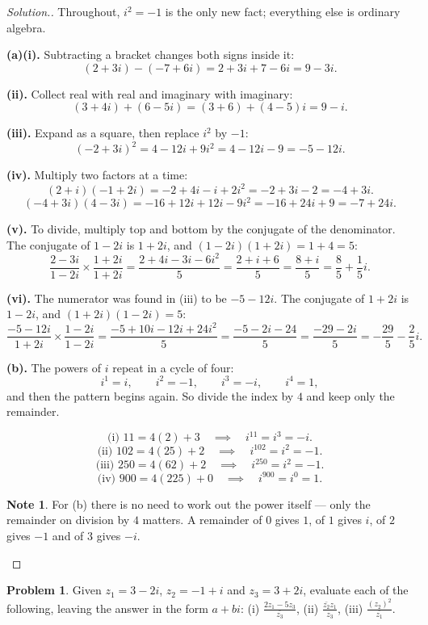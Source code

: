 \documentclass[11pt,a4paper]{article}
\theoremstyle{definition}
\newtheorem{note}[thm]{Note}
\newtheorem{problemx}{Problem}[section]
\newenvironment{problem}{\begin{problemx}}{\end{problemx}}
\newenvironment{solution}
  {\renewcommand{\qedsymbol}{}\begin{proof}[\textit{Solution}.]}
  {\end{proof}}
\begin{document}
\begin{solution}
Throughout, $i^2=-1$ is the only new fact; everything else is ordinary algebra.

\textbf{(a)(i).} Subtracting a bracket changes both signs inside it:
$$(2+3i)-(-7+6i)=2+3i+7-6i=9-3i.$$

\textbf{(ii).} Collect real with real and imaginary with imaginary:
$$(3+4i)+(6-5i)=(3+6)+(4-5)i=9-i.$$

\textbf{(iii).} Expand as a square, then replace $i^2$ by $-1$:
$$(-2+3i)^2=4-12i+9i^2=4-12i-9=-5-12i.$$

\textbf{(iv).} Multiply two factors at a time:
$$(2+i)(-1+2i)=-2+4i-i+2i^2=-2+3i-2=-4+3i.$$
$$(-4+3i)(4-3i)=-16+12i+12i-9i^2=-16+24i+9=-7+24i.$$

\textbf{(v).} To divide, multiply top and bottom by the conjugate of the denominator.
The conjugate of $1-2i$ is $1+2i$, and $(1-2i)(1+2i)=1+4=5$:
$$\frac{2-3i}{1-2i}\times\frac{1+2i}{1+2i}=\frac{2+4i-3i-6i^2}{5}
=\frac{2+i+6}{5}=\frac{8+i}{5}=\frac{8}{5}+\frac{1}{5}i.$$

\textbf{(vi).} The numerator was found in (iii) to be $-5-12i$. The conjugate of
$1+2i$ is $1-2i$, and $(1+2i)(1-2i)=5$:
$$\frac{-5-12i}{1+2i}\times\frac{1-2i}{1-2i}=\frac{-5+10i-12i+24i^2}{5}
=\frac{-5-2i-24}{5}=\frac{-29-2i}{5}=-\frac{29}{5}-\frac{2}{5}i.$$

\textbf{(b).} The powers of $i$ repeat in a cycle of four:
$$i^1=i,\qquad i^2=-1,\qquad i^3=-i,\qquad i^4=1,$$
and then the pattern begins again. So divide the index by $4$ and keep only the
remainder.

$$\text{(i) } 11=4(2)+3\quad\implies\quad i^{11}=i^3=-i.$$
$$\text{(ii) } 102=4(25)+2\quad\implies\quad i^{102}=i^2=-1.$$
$$\text{(iii) } 250=4(62)+2\quad\implies\quad i^{250}=i^2=-1.$$
$$\text{(iv) } 900=4(225)+0\quad\implies\quad i^{900}=i^0=1.$$

\begin{note}
For (b) there is no need to work out the power itself --- only the remainder on division
by $4$ matters. A remainder of $0$ gives $1$, of $1$ gives $i$, of $2$ gives $-1$ and of
$3$ gives $-i$.
\end{note}
\end{solution}

\begin{problem}
Given $z_1=3-2i$, $z_2=-1+i$ and $z_3=3+2i$, evaluate each of the following, leaving the
answer in the form $a+bi$:
\quad (i) $\frac{2z_1-5z_3}{\bar{z_3}}$, \quad (ii) $\frac{\bar{z_2}z_1}{z_3}$, \quad
(iii) $\frac{\left(z_2\right)^2}{\bar{z_1}}$.
\end{problem}
\end{document}

